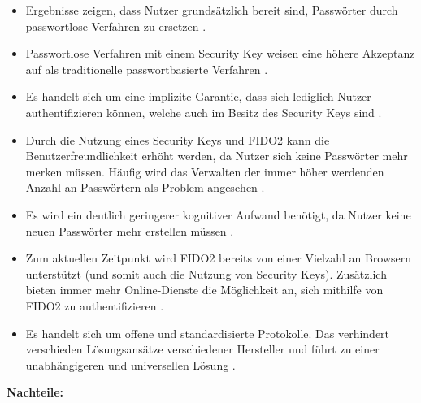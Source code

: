 \begin{itemize}
    \item Ergebnisse zeigen, dass Nutzer grundsätzlich bereit sind, Passwörter durch passwortlose Verfahren zu ersetzen \cite{lyastani2020fido2}.
    \item Passwortlose Verfahren mit einem Security Key weisen eine höhere Akzeptanz auf als traditionelle passwortbasierte Verfahren \cite{lyastani2020fido2}.
    \item Es handelt sich um eine implizite Garantie, dass sich lediglich Nutzer authentifizieren können, welche auch im Besitz des Security Keys sind \cite{lyastani2020fido2}.
    \item Durch die Nutzung eines Security Keys und \ac{FIDO}2 kann die Benutzerfreundlichkeit erhöht werden, da Nutzer sich keine Passwörter mehr merken müssen. Häufig wird das Verwalten der immer höher werdenden Anzahl an Passwörtern als Problem angesehen \cite{farke2020you} \cite{lyastani2020fido2}.
    \item Es wird ein deutlich geringerer kognitiver Aufwand benötigt, da Nutzer keine neuen Passwörter mehr erstellen müssen \cite{lyastani2020fido2}.
    \item Zum aktuellen Zeitpunkt wird \ac{FIDO}2 bereits von einer Vielzahl an Browsern unterstützt (und somit auch die Nutzung von Security Keys). Zusätzlich bieten immer mehr Online-Dienste die Möglichkeit an, sich mithilfe von \ac{FIDO}2 zu authentifizieren \cite{farke2020you} \cite{lyastani2020fido2}.
    \item Es handelt sich um offene und standardisierte Protokolle. Das verhindert verschieden Lösungsansätze verschiedener Hersteller und führt zu einer unabhängigeren und universellen Lösung \cite{farke2020you}.
\end{itemize}

\textbf{Nachteile:}

